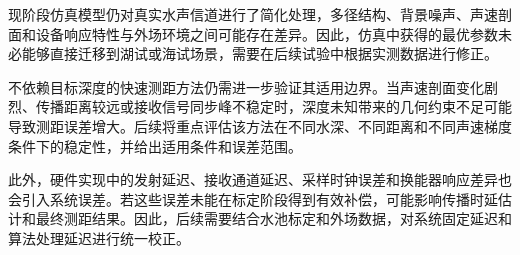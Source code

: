 现阶段仿真模型仍对真实水声信道进行了简化处理，多径结构、背景噪声、声速剖面和设备响应特性与外场环境之间可能存在差异。因此，仿真中获得的最优参数未必能够直接迁移到湖试或海试场景，需要在后续试验中根据实测数据进行修正。

不依赖目标深度的快速测距方法仍需进一步验证其适用边界。当声速剖面变化剧烈、传播距离较远或接收信号同步峰不稳定时，深度未知带来的几何约束不足可能导致测距误差增大。后续将重点评估该方法在不同水深、不同距离和不同声速梯度条件下的稳定性，并给出适用条件和误差范围。

此外，硬件实现中的发射延迟、接收通道延迟、采样时钟误差和换能器响应差异也会引入系统误差。若这些误差未能在标定阶段得到有效补偿，可能影响传播时延估计和最终测距结果。因此，后续需要结合水池标定和外场数据，对系统固定延迟和算法处理延迟进行统一校正。


